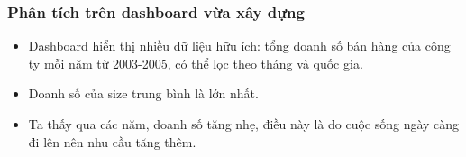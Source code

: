 \documentclass{article}
\begin{document}
\subsubsection{Phân tích trên dashboard vừa xây dựng}
 
\begin{itemize} 

    \item  Dashboard hiển thị nhiều dữ liệu hữu ích: tổng doanh số bán hàng của công ty mỗi năm từ 2003-2005, có thể lọc theo tháng và quốc gia.
    \item  Doanh số của size trung bình là lớn nhất.
    \item  Ta thấy qua các năm, doanh số tăng nhẹ, điều này là do cuộc sống ngày càng đi lên nên nhu cầu tăng thêm.
  
        \end{itemize} 
\end{document}
